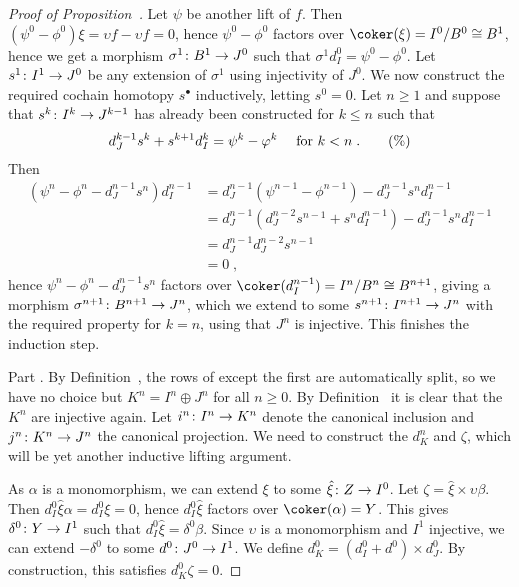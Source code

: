 \documentclass[a4paper,parskip=half,numbers=enddot, DIV=12]{scrreprt}
\begin{document}
\begin{proof}[Proof of Proposition~]
	Let $\psi $ be another lift of $f$. Then $(\psi^0-\phi^0)\xi=\upsilon f-\upsilon f=0$, hence $\psi^0-\phi^0$ factors over $\coker(\xi)=I^0/B^0\cong B^1$, hence we get a morphism $\sigma^1\colon B^1\morphism J^0$ such that $\sigma^1d_{I }^0=\psi^0-\phi^0$. Let $s^1\colon I^1\morphism J^0$ be any extension of $\sigma^1$ using injectivity of $J^0$. We now construct the required cochain homotopy $s^\bullet $ inductively, letting $s^0=0$. Let $n\geq 1$ and suppose that $s^k\colon I^k\morphism J^{k-1}$ has already been constructed for $k\leq n$ such that
	\begin{align}\lbl{eq:Horseshoe2}
		 d_{J }^{k-1}s^k+s^{k+1}d_{I }^k=\psi^k-\phi^k\quad\text{ for }k<n\;.\tag{\%}
	\end{align}
	Then
	\begin{align*}
		\left(\psi^n-\phi^n-d_{J }^{n-1}s^n\right)d_{I }^{n-1}&=d_{J }^{n-1}\left(\psi^{n-1}-\phi^{n-1}\right)-d_{J }^{n-1}s^nd_{I }^{n-1}\\
		&=d_{J }^{n-1}\left(d_{J }^{n-2}s^{n-1}+s^nd_{I }^{n-1}\right)-d_{J }^{n-1}s^nd_{I }^{n-1}\\
		&=d_{J }^{n-1}d_{J }^{n-2}s^{n-1}\\
		&=0\;,
	\end{align*}
	hence $\psi^n-\phi^n-d_{J }^{n-1}s^n$ factors over $\coker(d_{I }^{n-1})=I^n/B^n\cong B^{n+1}$, giving a morphism $\sigma^{n+1}\colon B^{n+1}\morphism J^n$, which we extend to some $s^{n+1}\colon I^{n+1}\morphism J^n$ with the required property  for $k=n$, using that $J^n$ is injective. This finishes the induction step.
	
	Part . By Definition~, the rows of  except the first are automatically split, so we have no choice but $K^n=I^n\oplus J^n$ for all $n\geq 0$. By Definition~ it is clear that the $K^n$ are injective again. Let $i^n\colon I^n\morphism K^n$ denote the canonical inclusion and $j^n\colon K^n\morphism J^n$ the canonical projection. We need to construct the $d_{K }^n$ and $\zeta$, which will be yet another inductive lifting argument.
	 
	 As $\alpha$ is a monomorphism, we can extend $\xi$ to some $\hat{\xi}\colon Z\morphism I^0$. Let $\zeta=\hat{\xi}\times \upsilon\beta$. Then $d_{I }^0\hat{\xi}\alpha=d_{I }^0\xi=0$, hence $d_{I }^0\hat{\xi}$ factors over $\coker(\alpha)=Y$. This gives $\delta^0\colon Y\morphism I^1$ such that $d_{I }^0\hat{\xi}=\delta^0\beta$. Since $\upsilon$ is a monomorphism and $I^1$ injective, we can extend $-\delta^0$ to some $d^0\colon J^0\morphism I^1$. We define $d_{K }^0=(d_{I }^0+d^0)\times d_{J }^0$. By construction, this satisfies $d_{K }^0\zeta=0$.
	 

\end{proof}
\end{document}
